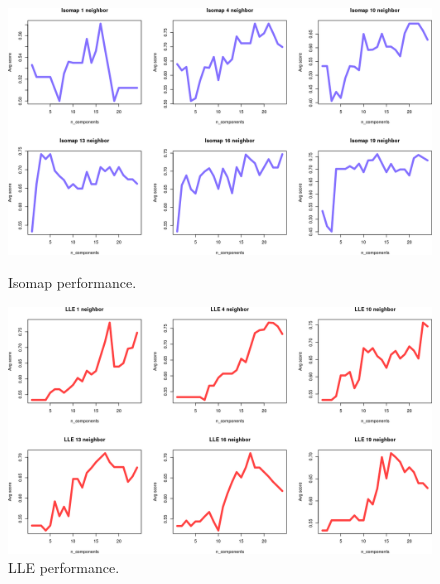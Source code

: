 \documentclass[11pt,a4paper]{article}
\begin{document}
\begin{figure}[H]
	\begin{minipage}[t]{0.5\linewidth}
		\centering
		\includegraphics[width=1\textwidth]{img/Isomap_plots.png}
		\caption{Isomap performance.}
		\label{f1}
	\end{minipage}
	\hspace{0.1cm}
	\begin{minipage}[t]{0.5\linewidth} 
		\centering
		\includegraphics[width=1\textwidth]{img/LLE_plots.png}
		\caption{LLE performance.}
		\label{g1_w}
	\end{minipage}        
\end{figure}
\end{document}
